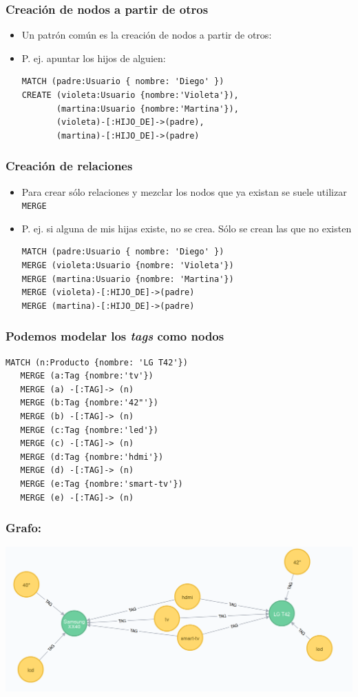 \documentclass[14pt]{beamer}
\begin{document}
\begin{frame}[fragile]
  \frametitle{Creación de nodos a partir de otros}
  \begin{itemize}
  \item Un patrón común es la creación de nodos a partir de otros:
\item P. ej. apuntar los hijos de alguien:
\begin{lstlisting}[language=cypher]
MATCH (padre:Usuario { nombre: 'Diego' })
CREATE (violeta:Usuario {nombre:'Violeta'}),
       (martina:Usuario {nombre:'Martina'}),
       (violeta)-[:HIJO_DE]->(padre),
       (martina)-[:HIJO_DE]->(padre)
\end{lstlisting}
  \end{itemize}
\end{frame}

\begin{frame}[fragile]
  \frametitle{Creación de relaciones}
  \begin{itemize}
  \item Para crear sólo relaciones y mezclar los nodos que ya existan se
    suele utilizar {\tt MERGE}
\item P. ej. si alguna de mis hijas existe, no se crea. Sólo se crean las
  que no existen
\begin{lstlisting}[language=cypher]
MATCH (padre:Usuario { nombre: 'Diego' })
MERGE (violeta:Usuario {nombre: 'Violeta'})
MERGE (martina:Usuario {nombre: 'Martina'})
MERGE (violeta)-[:HIJO_DE]->(padre)
MERGE (martina)-[:HIJO_DE]->(padre)
\end{lstlisting}
  \end{itemize}
\end{frame}

\begin{frame}[fragile]
  \frametitle{Podemos modelar los {\em tags\/} como nodos}
\begin{lstlisting}[language=cypher]
MATCH (n:Producto {nombre: 'LG T42'})
   MERGE (a:Tag {nombre:'tv'})
   MERGE (a) -[:TAG]-> (n)
   MERGE (b:Tag {nombre:'42"'})
   MERGE (b) -[:TAG]-> (n)
   MERGE (c:Tag {nombre:'led'})
   MERGE (c) -[:TAG]-> (n)
   MERGE (d:Tag {nombre:'hdmi'})
   MERGE (d) -[:TAG]-> (n)
   MERGE (e:Tag {nombre:'smart-tv'})
   MERGE (e) -[:TAG]-> (n)
\end{lstlisting}
\end{frame}

\begin{frame}
  \frametitle{Grafo:}
  \includegraphics[width=\textwidth]{img/neo4j1}
\end{frame}
\end{document}
